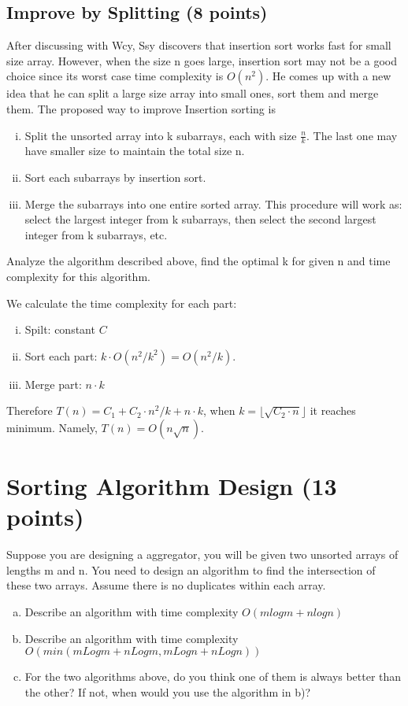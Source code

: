 \documentclass[11pt]{exam}
\begin{document}
\subsection{Improve by Splitting (8 points)}
After discussing with Wcy, Ssy discovers that insertion sort works fast for small size array. However, when the size n goes large, insertion sort may not be a good choice since its worst case time complexity is $O(n^2)$. He comes up with a new idea that he can split a large size array into small ones, sort them and merge them. The proposed way to improve Insertion sorting is
\begin{enumerate}[i)]
    \item Split the unsorted array into k subarrays, each with size $\frac{n}{k}$. The last one may have smaller size to maintain the total size n.
    \item Sort each subarrays by insertion sort.
    \item Merge the subarrays into one entire sorted array. This procedure will work as: select the largest integer from k subarrays, then select the second largest integer from k subarrays, etc.
\end{enumerate}
Analyze the algorithm described above, find the optimal k for given n and time complexity for this algorithm.

\begin{solution}
We calculate the time complexity for each part:
\begin{enumerate}[i)]
    \item Spilt: constant $C$
    \item Sort each part: $k \cdot O(n^2 / k^2) = O (n^2 / k) $.
    \item Merge part: $n \cdot k$
\end{enumerate}
Therefore $T(n) = C_1 + C_2 \cdot n^2/k + n\cdot k $, when $k = \lfloor\sqrt{ C_2 \cdot n}\rfloor $ it reaches minimum.
Namely, $T(n) = O(n\sqrt{n})$.

\end{solution}

\section{Sorting Algorithm Design (13 points)}
Suppose you are designing a aggregator, you will be given two unsorted arrays of lengths m and n. You need to design an algorithm to find the intersection of these two arrays. Assume there is no duplicates within each array.
\begin{enumerate}[a)]
    \item Describe an algorithm with time complexity $O(m log m + n log n)$
    \item Describe an algorithm with time complexity $O(min(mLogm + nLogm, mLogn + nLogn))$
    \item For the two algorithms above, do you think one of them is always better than the other? If not, when would you use the algorithm in b)?
\end{enumerate}
\end{document}
